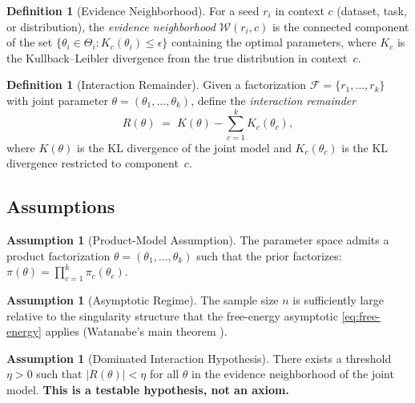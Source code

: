 \documentclass[11pt,a4paper]{article}
\theoremstyle{definition}
\newtheorem{definition}[theorem]{Definition}
\newtheorem{assumption}[theorem]{Assumption}
\theoremstyle{remark}
\newcommand{\cF}{\mathcal{F}}
\newcommand{\cW}{\mathcal{W}}
\begin{document}
\begin{definition}[Evidence Neighborhood]\label{def:evidence-nbhd}
  For a seed $r_i$ in context $c$ (dataset, task, or distribution), the
  \emph{evidence neighborhood} $\cW(r_i, c)$ is the connected component of the
  set $\{\theta_i \in \Theta_i : K_{c}(\theta_i) \leq \epsilon\}$ containing
  the optimal parameters, where $K_c$ is the Kullback--Leibler divergence from
  the true distribution in context~$c$.
\end{definition}

\begin{definition}[Interaction Remainder]\label{def:interaction-remainder}
  Given a factorization $\cF = \{r_1, \ldots, r_k\}$ with joint parameter
  $\theta = (\theta_1, \ldots, \theta_k)$, define the \emph{interaction
  remainder}
  \begin{equation}\label{eq:interaction-remainder}
    R(\theta) \;=\; K(\theta) - \sum_{c=1}^{k} K_c(\theta_c),
  \end{equation}
  where $K(\theta)$ is the KL divergence of the joint model and $K_c(\theta_c)$
  is the KL divergence restricted to component~$c$.
\end{definition}

\subsection{Assumptions}

\begin{assumption}[Product-Model Assumption]\label{asm:product}
  The parameter space admits a product factorization
  $\theta = (\theta_1, \ldots, \theta_k)$ such that the prior factorizes:
  $\pi(\theta) = \prod_{c=1}^{k} \pi_c(\theta_c)$.
\end{assumption}

\begin{assumption}[Asymptotic Regime]\label{asm:asymptotic}
  The sample size $n$ is sufficiently large relative to the singularity
  structure that the free-energy asymptotic \eqref{eq:free-energy} applies
  (Watanabe's main theorem \cite{Watanabe2009}).
\end{assumption}

\begin{assumption}[Dominated Interaction Hypothesis]\label{asm:dominated}
  There exists a threshold $\eta > 0$ such that $|R(\theta)| < \eta$ for all
  $\theta$ in the evidence neighborhood of the joint model.  \textbf{This is a
  testable hypothesis, not an axiom.}
\end{assumption}
\end{document}
